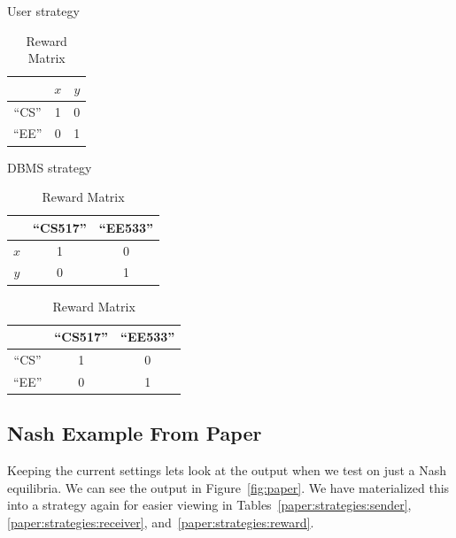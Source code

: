 \documentclass{article}
\begin{document}
\begin{table}[h!]
    \centering
    \begin{minipage}{.2\linewidth}
        \caption{User strategy}
        \centering
        \begin{tabular}{c|c|c|}
            \cline{2-3}
             & \multicolumn{1}{c|}{$x$} & $y$\\
            \hline
            \multicolumn{1}{|c|}{``CS''} & 1 & 0\\
            \hline
            \multicolumn{1}{|c|}{``EE''} & 0 & 1\\
            \hline
        \end{tabular}
        \label{strictpaper:strategies:sender}
    \end{minipage}
    \begin{minipage}{.35\linewidth}
        \caption{DBMS strategy}
        \centering
        \begin{tabular}{c|c|c|}
            \cline{2-3}
             & \multicolumn{1}{c|}{``CS517''} & ``EE533''\\
            \hline
            \multicolumn{1}{|c|}{$x$} & 1 & 0\\
            \hline
            \multicolumn{1}{|c|}{$y$} & 0 & 1\\
            \hline
        \end{tabular}
        \label{strictpaper:strategies:receiver}
    \end{minipage}
       \begin{minipage}{.3\linewidth}
        \caption{Reward Matrix}
        \centering
        \begin{tabular}{c|c|c|}
            \cline{2-3}
             & \multicolumn{1}{c|}{``CS517''} & ``EE533''\\
            \hline
            \multicolumn{1}{|c|}{``CS''} & 1 & 0\\
            \hline
            \multicolumn{1}{|c|}{``EE''} & 0 & 1\\
            \hline
        \end{tabular}
        \label{strictpaper:strategies:reward}
    \end{minipage}
\end{table}

\subsection{Nash Example From Paper}
Keeping the current settings lets look at the output when we test on just a Nash equilibria. We can see the output in Figure~\ref{fig:paper}. We have materialized this into a strategy again for easier viewing in Tables~\ref{paper:strategies:sender},\ref{paper:strategies:receiver}, and~\ref{paper:strategies:reward}. 
\end{document}
